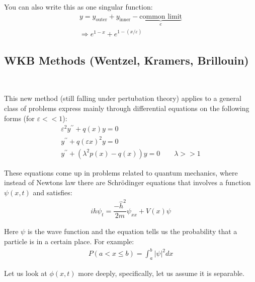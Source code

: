\par\bigskip
\noindent You can also write this as one singular function:
\begin{equation*}
  \begin{gathered}
    y = y_{\text{outer}} + y_{\text{inner}} - \underbrace{\text{common limit}}_{\text{$e$}}\\
    \Rightarrow e^{1-x}+e^{1-(x/\varepsilon)}
  \end{gathered}
\end{equation*}
\par\bigskip
\subsection{WKB Methods (Wentzel, Kramers, Brillouin)}\hfill\\
\par\bigskip
\noindent This new method (still falling under pertubation theory) applies to a general class of problems express mainly through differential equations on the following forms (for $\varepsilon<<1$):
\begin{equation*}
  \begin{gathered}
    \varepsilon^2y^{\prime\prime}+q(x)y=0\\
    y^{\prime\prime}+q(\varepsilon x)^2y = 0\\
    y^{\prime\prime}+(\lambda^2p(x)-q(x))y=0\qquad\lambda >>1
  \end{gathered}
\end{equation*}
\par\bigskip
\noindent These equations come up in problems related to quantum mechanics, where instead of Newtons law there are Schrödinger equations that involves a function $\psi(x,t)$ and satisfies:
\begin{equation*}
  \begin{gathered}
    i\hat{h}\psi_t = \dfrac{-\hat{h}^2}{2m}\psi_{xx}+V(x)\psi
  \end{gathered}
\end{equation*}\par
\noindent Here $\psi$ is the wave function and the equation tells us the probability that a particle is in a certain place. For example:
\begin{equation*}
  \begin{gathered}
    P(a<x\leq b) = \int_{a}^{b}\left|\psi\right|^2dx
  \end{gathered}
\end{equation*}\par
\noindent Let us look at $\phi(x,t)$ more deeply, specifically, let us assume it is separable.\par

